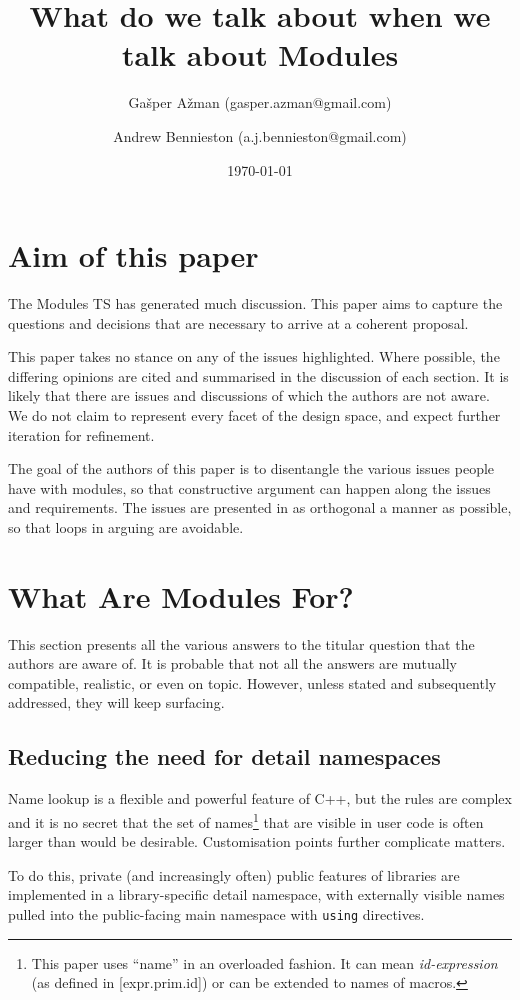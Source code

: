 \documentclass[reqno]{article}
\title{What do we talk about when we talk about Modules}
\author{Gašper Ažman \small{(gasper.azman@gmail.com)}
\and Andrew Bennieston \small{(a.j.bennieston@gmail.com)}}
\date{\today}
\begin{document}
\maketitle
\section{Aim of this paper}

The Modules TS \citep{N4647} has generated much discussion. This paper aims to
capture the questions and decisions that are necessary to arrive at a coherent
proposal.

This paper takes no stance on any of the issues highlighted. Where possible,
the differing opinions are cited and summarised in the discussion of each
section. It is likely that there are issues and discussions of which the
authors are not aware. We do not claim to represent every facet of the design
space, and expect further iteration for refinement.

The goal of the authors of this paper is to disentangle the various issues
people have with modules, so that constructive argument can happen along the
issues and requirements. The issues are presented in as orthogonal a manner as
possible, so that loops in arguing are avoidable.


\section{What Are Modules For?}

This section presents all the various answers to the titular question that the
authors are aware of. It is probable that not all the answers are mutually
compatible, realistic, or even on topic. However, unless stated and
subsequently addressed, they will keep surfacing.


\subsection{Reducing the need for detail namespaces}

Name lookup is a flexible and powerful feature of C++, but the rules are
complex and it is no secret that the set of names\footnote{This paper uses
``name'' in an overloaded fashion. It can mean \emph{id-expression} (as defined
in [expr.prim.id]) or can be extended to names of macros.} that are visible in
user code is often larger than would be desirable. Customisation points further
complicate matters.

To do this, private (and increasingly often) public features of libraries are
implemented in a library-specific detail namespace, with externally visible
names pulled into the public-facing main namespace with \texttt{using}
directives.
\end{document}
